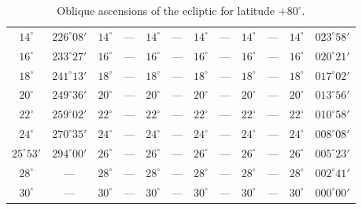 \begin{table}[!h]
{\begin{tabular}{cc|cc|cc|cc|cc|cc}
$14^\circ$ & $226^\circ08'$ & $14^\circ$ & --- & $14^\circ$ & --- & $14^\circ$ & --- &  $14^\circ$ & --- & $14^\circ$ & $023^\circ58'$\\
$16^\circ$ & $233^\circ27'$ & $16^\circ$ & --- & $16^\circ$ & --- & $16^\circ$ & --- &  $16^\circ$ & --- & $16^\circ$ & $020^\circ21'$\\
$18^\circ$ & $241^\circ13'$ & $18^\circ$ & --- & $18^\circ$ & --- & $18^\circ$ & --- &  $18^\circ$ & --- & $18^\circ$ & $017^\circ02'$\\
$20^\circ$ & $249^\circ36'$ & $20^\circ$ & --- & $20^\circ$ & --- & $20^\circ$ & --- &  $20^\circ$ & --- & $20^\circ$ & $013^\circ56'$\\
$22^\circ$ & $259^\circ02'$ & $22^\circ$ & --- & $22^\circ$ & --- & $22^\circ$ & --- &  $22^\circ$ & --- & $22^\circ$ & $010^\circ58'$\\
$24^\circ$ & $270^\circ35'$ & $24^\circ$ & --- & $24^\circ$ & --- & $24^\circ$ & --- &  $24^\circ$ & --- & $24^\circ$ & $008^\circ08'$\\
$25^\circ53'$ & $294^\circ00'$ & $26^\circ$ & --- & $26^\circ$ & --- & $26^\circ$ & --- &  $26^\circ$ & --- & $26^\circ$ & $005^\circ23'$\\
$28^\circ$ & --- & $28^\circ$ & --- & $28^\circ$ & --- & $28^\circ$ & --- &  $28^\circ$ & --- & $28^\circ$ & $002^\circ41'$\\
$30^\circ$ & --- & $30^\circ$ & --- & $30^\circ$ & --- & $30^\circ$ & --- &  $30^\circ$ & --- & $30^\circ$ & $000^\circ00'$\\
\end{tabular}}
\caption{Oblique ascensions of the ecliptic for latitude $+80^\circ$.}
\end{table}

